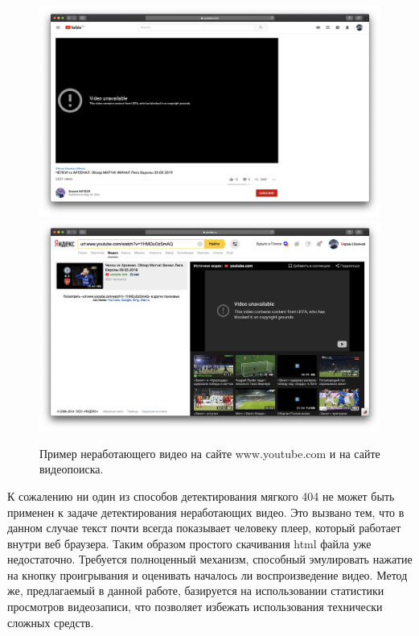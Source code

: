 \begin{figure}
    \centering
    \includegraphics[width=\textwidth]{../images/youtube_bad}
    \includegraphics[width=\textwidth]{../images/yandex_video_bad}
    \caption{Пример неработающего видео на сайте www.youtube.com и на сайте видеопоиска.}
    \label{fig:bad_video}
\end{figure}

К сожалению ни один из способов детектирования мягкого 404 не может быть применен к задаче детектирования неработающих видео. Это вызвано тем, что в данном случае текст почти всегда показывает человеку плеер, который работает внутри веб браузера. Таким образом простого скачивания html файла уже недостаточно. Требуется полноценный механизм, способный эмулировать нажатие на кнопку проигрывания и оценивать началось ли воспроизведение видео. Метод же, предлагаемый в данной работе, базируется на использовании статистики просмотров видеозаписи, что позволяет избежать использования технически сложных средств.